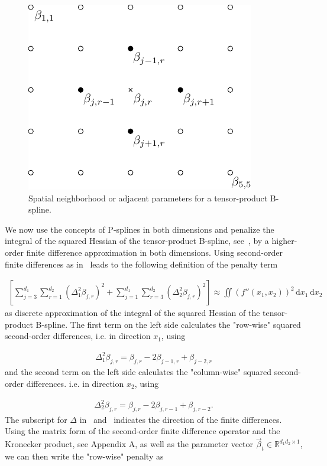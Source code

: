 \begin{figure}[H]
	\centering	
	\includegraphics{graphics/pgfplots/cha2/tps-spatial-neighborhood.pdf}
	\caption{Spatial neighborhood or adjacent parameters for a tensor-product B-spline.}
	\label{fig:tps-neighborhood}
\end{figure}
%
We now use the concepts of P-splines in both dimensions and penalize the integral of the squared Hessian of the tensor-product B-spline, see~, by a higher-order finite difference approximation in both dimensions. Using second-order finite differences as in~ leads to the following definition of the penalty term

\begin{align}
	\left[ \sum_{j=3}^{d_1} \sum_{r=1}^{d_2} (\Delta_1^2 \beta_{j,r})^2 + \sum_{j=1}^{d_1} \sum_{r=3}^{d_2} (\Delta_2^2 \beta_{j,r})^2 \right] \approx \iint \left(f''(x_1, x_2) \right)^2 \,\mathrm{d}x_1 \,\mathrm{d}x_2
\end{align}
%
as discrete approximation of the integral of the squared Hessian of the tensor-product B-spline. The first term on the left side calculates the "row-wise" squared second-order differences, i.e. in direction $x_1$, using

\begin{align} \label{eq:row-wise-diff-operator}
	\Delta_1^2 \beta_{j,r} = \beta_{j,r} - 2\beta_{j-1,r} + \beta_{j-2,r} 
\end{align}
%
and the second term on the left side calculates the "column-wise" squared second-order differences. i.e. in direction $x_2$, using

\begin{align} \label{eq:col-wise-diff-operator}
	\Delta_2^2 \beta_{j,r} = \beta_{j,r} -2\beta_{j,r-1} + \beta_{j,r-2}.
\end{align}
%
The subscript for $\Delta$ in~ and~ indicates the direction of the finite differences. Using the matrix form of the second-order finite difference operator and the Kronecker product, see Appendix A, as well as the parameter vector $\vec{\beta}_t \in \mathbb{R}^{d_1 d_2 \times 1}$, we can then write the "row-wise" penalty as

